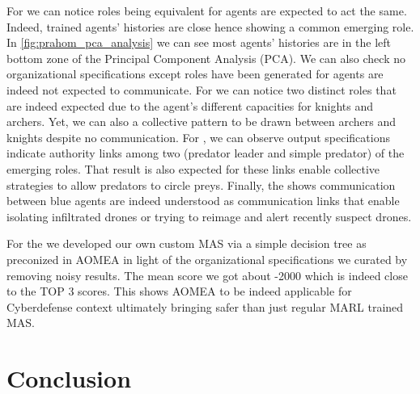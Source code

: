 \documentclass[runningheads]{llncs}
\begin{document}



For  we can notice roles being equivalent for agents are expected to act the same. Indeed, trained agents' histories are close hence showing a common emerging role. In \autoref{fig:prahom_pca_analysis} we can see most agents’ histories are in the left bottom zone of the Principal Component Analysis (PCA). We can also check no organizational specifications except roles have been generated for agents are indeed not expected to communicate. For  we can notice two distinct roles that are indeed expected due to the agent's different capacities for knights and archers. Yet, we can also a collective pattern to be drawn between archers and knights despite no communication. For , we can observe output specifications indicate authority links among two (predator leader and simple predator) of the emerging roles. That result is also expected for these links enable collective strategies to allow predators to circle preys. Finally, the  shows communication between blue agents are indeed understood as communication links that enable isolating infiltrated drones or trying to reimage and alert recently suspect drones.

For the  we developed our own custom MAS via a simple decision tree as preconized in AOMEA in light of the organizational specifications we curated by removing noisy results. The mean score we got about -2000 which is indeed close to the TOP 3 scores. This shows AOMEA to be indeed applicable for Cyberdefense context ultimately bringing safer than just regular MARL trained MAS.

\section{Conclusion}


\end{document}
